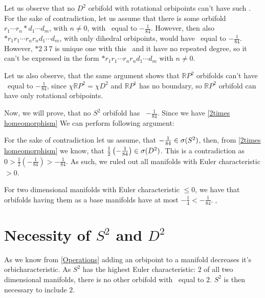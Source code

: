 Let us observe that no $D^2$ orbifold with rotational orbipoints can't have such \Eoc. 
For the sake of contradiction, let us assume that there is some orbifold 
$r_1 \cdots r_n * d_1 \cdots d_m$, with $n\neq 0$, with \Eoc\ equal to $-\frac{1}{84}$. 
However, then also $*r_1r_1 \cdots r_nr_nd_1\cdots d_m$, 
with only dihedral orbipoints, 
would have \Eoc\ equal to $-\frac{1}{84}$. However, $*2\ 3\ 7$ is unique one with this \Eoc\ 
and it have no repeated degree, so it can't be expressed in the form 
$*r_1r_1 \cdots r_nr_nd_1\cdots d_m$ 
with $n\neq 0$. 

Let us also observe, that the same argument shows that $\mathbb{R}P^2$ orbifolds 
can't have \Eoc\ equal to $-\frac{1}{84}$, since $\chi{\mathbb{R}P^2} = \chi{D^2}$ 
and $\mathbb{R}P^1$ has no boundary, so $\mathbb{R}P^2$ orbifold can have only rotational 
orbipoints. 
 
Now, we will prove, that no $S^2$ orbifold has \Eoc\ $-\frac{1}{84}$. 
Since we have \ref{2times homeomorphism} 
We can perform following argument:  
 
For the sake of contradiction let us assume, that 
$-\frac{1}{84} \in {{\sigma}(S^2)}$, then, from \ref{2times homeomorphism} we know, that 
$\frac{1}{2}\left(-\frac{1}{84}\right)\in {{\sigma}(D^2)}$. This is a contradiction as 
$0 > \frac{1}{2}\left(-\frac{1}{84}\right) > -\frac{1}{84}$. 
As such, we ruled out all manifolds with Euler characteristic $>0$. 

For 
two dimensional manifolds 
with Euler characteristic $\leq 0$, we have that orbifolds having them as a base manifolds 
have \Eoc at most $-\frac{1}{4} < -\frac{1}{84}$. 
$_\square$ 

\section{Necessity of $S^2$ and $D^2$}\label{neccessity of d2 and s2}
As we know from \ref{Operations} adding an orbipoint to a manifold decreases it's 
orbicharacteristic. As $S^2$ has the highest Euler characteristic: $2$ of all 
two dimensional manifolds, there is no other orbifold with \Eoc\ equal to $2$. 
$S^2$ is then necessary to include $2$. 

